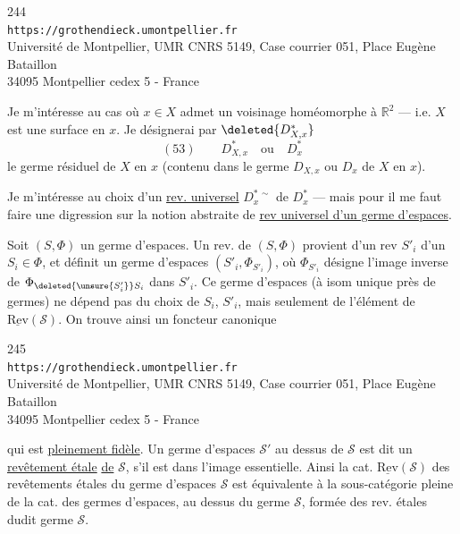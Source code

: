 
\begin{center}
244\\
\texttt{https://grothendieck.umontpellier.fr}\\
Université de Montpellier, UMR CNRS 5149, Case courrier 051, Place Eugène Bataillon\\
34095 Montpellier cedex 5 - France
\end{center}

 Je m'intéresse au cas où $x\in X$ admet un voisinage homéomorphe à $\mathbb R^2$ --- i.e. $X$ est une surface en $x$. Je désignerai par $\deleted{D_{X,x}^{*}}$
\[
(53)\qquad D_{X,x}^{*}\quad\text{ou}\quad D_x^{*}
\]
le germe résiduel de $X$ en $x$ (contenu dans le germe $D_{X,x}$ ou $D_x$ de $X$ en $x$).

Je m'intéresse au choix d'un \uline{rev. universel} $D_x^{*\,\sim}$ de $D_x^{*}$ --- mais pour  il me faut faire une digression sur la notion abstraite de \uline{rev universel d'un germe d'espaces}.

Soit $(S,\Phi)$ un germe d'espaces. Un rev. de $(S,\Phi)$ provient d'un rev $S'_i$ d'un $S_i\in\Phi$, et définit un germe d'espaces $(S'_i,\Phi_{S'_i})$, où $\Phi_{S'_i}$ désigne l'image inverse de $\Phi_{\deleted{\unsure{S'_i}}S_i}$ dans $S'_i$. Ce germe d'espaces  (à isom unique près de germes) ne dépend pas du choix de $S_i$, $S'_i$, mais seulement de l'élément de $\underline{\mathrm{Rev}}(\mathcal S)$. On trouve ainsi un foncteur canonique


\begin{center}
245\\
\texttt{https://grothendieck.umontpellier.fr}\\
Université de Montpellier, UMR CNRS 5149, Case courrier 051, Place Eugène Bataillon\\
34095 Montpellier cedex 5 - France
\end{center}


qui est \uline{pleinement fidèle}. Un germe d'espaces $\mathcal S'$ au dessus de $\mathcal S$ est dit  un \uline{revêtement étale} \uline{de} $\mathcal S$, s'il est dans l'image essentielle. Ainsi la cat. $\underline{\mathrm{Rev}}(\mathcal S)$ des revêtements étales du germe d'espaces $\mathcal S$ est équivalente à la sous-catégorie pleine de la  cat. des germes d'espaces, au dessus du germe $\mathcal S$,  formée des rev. étales dudit germe $\mathcal S$.

